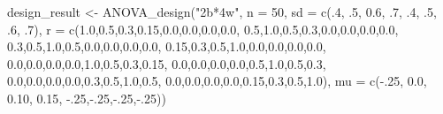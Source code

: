 \documentclass[
]{book}
\newenvironment{Shaded}{\begin{snugshade}}{\end{snugshade}}
\newcommand{\AttributeTok}[1]{\textcolor[rgb]{0.77,0.63,0.00}{#1}}
\newcommand{\DecValTok}[1]{\textcolor[rgb]{0.00,0.00,0.81}{#1}}
\newcommand{\FloatTok}[1]{\textcolor[rgb]{0.00,0.00,0.81}{#1}}
\newcommand{\FunctionTok}[1]{\textcolor[rgb]{0.00,0.00,0.00}{#1}}
\newcommand{\NormalTok}[1]{#1}
\newcommand{\OtherTok}[1]{\textcolor[rgb]{0.56,0.35,0.01}{#1}}
\newcommand{\SpecialCharTok}[1]{\textcolor[rgb]{0.00,0.00,0.00}{#1}}
\newcommand{\StringTok}[1]{\textcolor[rgb]{0.31,0.60,0.02}{#1}}
\begin{document}
\begin{Shaded}
\begin{Highlighting}[]
\NormalTok{design\_result }\OtherTok{\textless{}{-}} \FunctionTok{ANOVA\_design}\NormalTok{(}\StringTok{"2b*4w"}\NormalTok{,}
                              \AttributeTok{n =} \DecValTok{50}\NormalTok{,}
                              \AttributeTok{sd =} \FunctionTok{c}\NormalTok{(.}\DecValTok{4}\NormalTok{, .}\DecValTok{5}\NormalTok{, }\FloatTok{0.6}\NormalTok{, .}\DecValTok{7}\NormalTok{,}
\NormalTok{                                     .}\DecValTok{4}\NormalTok{, .}\DecValTok{5}\NormalTok{, .}\DecValTok{6}\NormalTok{, .}\DecValTok{7}\NormalTok{),}
                              \AttributeTok{r =} \FunctionTok{c}\NormalTok{(}\FloatTok{1.0}\NormalTok{,}\FloatTok{0.5}\NormalTok{,}\FloatTok{0.3}\NormalTok{,}\FloatTok{0.15}\NormalTok{,}\FloatTok{0.0}\NormalTok{,}\FloatTok{0.0}\NormalTok{,}\FloatTok{0.0}\NormalTok{,}\FloatTok{0.0}\NormalTok{,}
                                    \FloatTok{0.5}\NormalTok{,}\FloatTok{1.0}\NormalTok{,}\FloatTok{0.5}\NormalTok{,}\FloatTok{0.3}\NormalTok{,}\FloatTok{0.0}\NormalTok{,}\FloatTok{0.0}\NormalTok{,}\FloatTok{0.0}\NormalTok{,}\FloatTok{0.0}\NormalTok{,}
                                    \FloatTok{0.3}\NormalTok{,}\FloatTok{0.5}\NormalTok{,}\FloatTok{1.0}\NormalTok{,}\FloatTok{0.5}\NormalTok{,}\FloatTok{0.0}\NormalTok{,}\FloatTok{0.0}\NormalTok{,}\FloatTok{0.0}\NormalTok{,}\FloatTok{0.0}\NormalTok{,}
                                    \FloatTok{0.15}\NormalTok{,}\FloatTok{0.3}\NormalTok{,}\FloatTok{0.5}\NormalTok{,}\FloatTok{1.0}\NormalTok{,}\FloatTok{0.0}\NormalTok{,}\FloatTok{0.0}\NormalTok{,}\FloatTok{0.0}\NormalTok{,}\FloatTok{0.0}\NormalTok{,}
                                    \FloatTok{0.0}\NormalTok{,}\FloatTok{0.0}\NormalTok{,}\FloatTok{0.0}\NormalTok{,}\FloatTok{0.0}\NormalTok{,}\FloatTok{1.0}\NormalTok{,}\FloatTok{0.5}\NormalTok{,}\FloatTok{0.3}\NormalTok{,}\FloatTok{0.15}\NormalTok{,}
                                    \FloatTok{0.0}\NormalTok{,}\FloatTok{0.0}\NormalTok{,}\FloatTok{0.0}\NormalTok{,}\FloatTok{0.0}\NormalTok{,}\FloatTok{0.5}\NormalTok{,}\FloatTok{1.0}\NormalTok{,}\FloatTok{0.5}\NormalTok{,}\FloatTok{0.3}\NormalTok{,}
                                    \FloatTok{0.0}\NormalTok{,}\FloatTok{0.0}\NormalTok{,}\FloatTok{0.0}\NormalTok{,}\FloatTok{0.0}\NormalTok{,}\FloatTok{0.3}\NormalTok{,}\FloatTok{0.5}\NormalTok{,}\FloatTok{1.0}\NormalTok{,}\FloatTok{0.5}\NormalTok{,}
                                    \FloatTok{0.0}\NormalTok{,}\FloatTok{0.0}\NormalTok{,}\FloatTok{0.0}\NormalTok{,}\FloatTok{0.0}\NormalTok{,}\FloatTok{0.15}\NormalTok{,}\FloatTok{0.3}\NormalTok{,}\FloatTok{0.5}\NormalTok{,}\FloatTok{1.0}\NormalTok{),}
                              \AttributeTok{mu =} \FunctionTok{c}\NormalTok{(}\SpecialCharTok{{-}}\NormalTok{.}\DecValTok{25}\NormalTok{, }\FloatTok{0.0}\NormalTok{, }\FloatTok{0.10}\NormalTok{, }\FloatTok{0.15}\NormalTok{,}
                                     \SpecialCharTok{{-}}\NormalTok{.}\DecValTok{25}\NormalTok{,}\SpecialCharTok{{-}}\NormalTok{.}\DecValTok{25}\NormalTok{,}\SpecialCharTok{{-}}\NormalTok{.}\DecValTok{25}\NormalTok{,}\SpecialCharTok{{-}}\NormalTok{.}\DecValTok{25}\NormalTok{))}
\end{Highlighting}
\end{Shaded}
\end{document}
